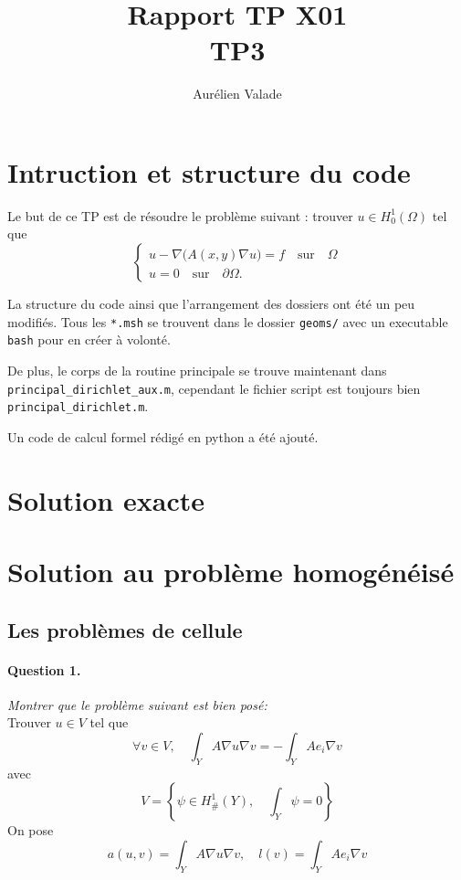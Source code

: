 \documentclass[11pt]{article}
\title{Rapport TP X01 \\ TP3}
\author{Aurélien Valade}
\date{}
\newcommand{\question}[2]{\paragraph{Question #1.}\textit{#2} \\}
\newcommand{\Hd}{H^1_{\#}}
\begin{document}
\maketitle

\section{Intruction et structure du code}


Le but de ce TP est de résoudre le problème suivant : trouver $u \in H^1_0(\Omega)$ tel que  
\begin{equation}
  \begin{cases}
    u - \nabla \big(A(x,y) \nabla u\big) = f \quad \mbox{sur}\quad \Omega\\
    u = 0 \quad \mbox{sur}\quad \partial\Omega.
  \end{cases}
\end{equation}

La structure du code ainsi que l'arrangement des dossiers ont été un peu modifiés. Tous les \texttt{*.msh} se trouvent dans le dossier \texttt{geoms/} avec un executable \texttt{bash} pour en créer à volonté.

De plus, le corps de la routine principale se trouve maintenant dans \texttt{principal\_dirichlet\_aux.m}, cependant le fichier script est toujours bien \texttt{principal\_dirichlet.m}. 

Un code de calcul formel rédigé en python a été ajouté. 

\section{Solution exacte}


\section{Solution au problème homogénéisé}

\subsection{Les problèmes de cellule}

\question{1}{Montrer que le problème suivant est bien posé:}

Trouver $u \in V$ tel que
\begin{equation}
  \forall v \in V, \quad \int_Y A \nabla u \nabla v = - \int_Y A e_i \nabla v
\end{equation}
avec
\begin{equation}
  V = 
  \left\{
    \psi \in \Hd(Y), \quad \int_Y \psi = 0
  \right\}
\end{equation}
On pose
\begin{equation}
  a(u,v) = \int_Y A \nabla u \nabla v, \quad
  l(v) = \int_Y A e_i \nabla v
\end{equation}
\end{document}
